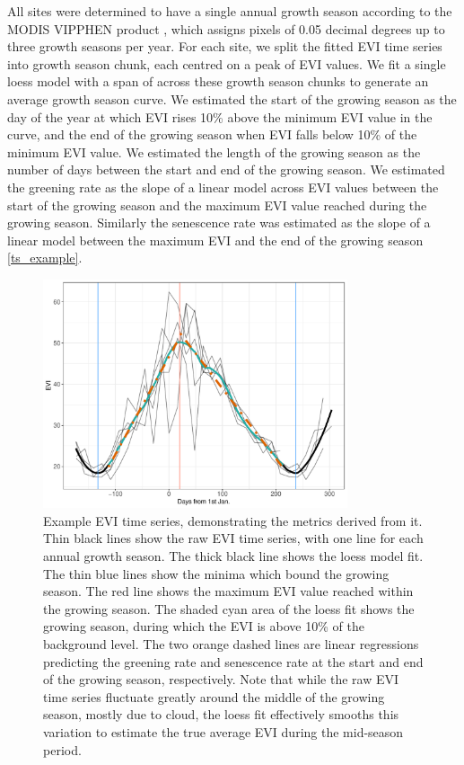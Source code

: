 \documentclass[11pt,a4paper]{article}
\begin{document}
All sites were determined to have a single annual growth season according to the MODIS VIPPHEN product \citep{}, which assigns pixels of 0.05 decimal degrees up to three growth seasons per year. For each site, we split the fitted EVI time series into growth season chunk, each centred on a peak of EVI values. We fit a single loess model with a span of \loessSpan{} across these growth season chunks to generate an average growth season curve. We estimated the start of the growing season as the day of the year at which EVI rises 10\% above the minimum EVI value in the curve, and the end of the growing season when EVI falls below 10\% of the minimum EVI value. We estimated the length of the growing season as the number of days between the start and end of the growing season. We estimated the greening rate as the slope of a linear model across EVI values between the start of the growing season and the maximum EVI value reached during the growing season. Similarly the senescence rate was estimated as the slope of a linear model between the maximum EVI and the end of the growing season \autoref{ts_example}.

\begin{figure}[H]
\centering
	\includegraphics[width=0.8\textwidth]{ts_example}
	\caption{Example EVI time series, demonstrating the metrics derived from it. Thin black lines show the raw EVI time series, with one line for each annual growth season. The thick black line shows the loess model fit. The thin blue lines show the minima which bound the growing season. The red line shows the maximum EVI value reached within the growing season. The shaded cyan area of the loess fit shows the growing season, during which the EVI is above 10\% of the background level. The two orange dashed lines are linear regressions predicting the greening rate and senescence rate at the start and end of the growing season, respectively. Note that while the raw EVI time series fluctuate greatly around the middle of the growing season, mostly due to cloud, the loess fit effectively smooths this variation to estimate the true average EVI during the mid-season period.}
	\label{ts_example}
\end{figure}
\end{document}
